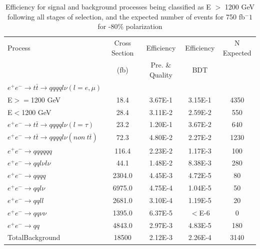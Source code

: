 \begin{table}
  \centering
  \begin{tabular}{l | c | c | c | c}
    \toprule
     Process     & Cross Section & Efficiency & Efficiency & N Expected\\
     & (fb) & Pre. \& Quality & BDT & \\
     \midrule
    $e^+e^-\rightarrow t\bar{t} \rightarrow qqqql\nu (l=e,\mu)$&  &  & &\\
     E$>=$1200 GeV & 18.4 & 3.67E-1 & 3.15E-1 & 4350\\
     E$<$1200 GeV & 28.4 & 3.11E-2 & 2.59E-2 & 550 \\
    \midrule
    $e^+e^-\rightarrow t\bar{t} \rightarrow qqqql\nu (l=\tau)$& 23.2 & 1.20E-1 & 3.67E-2 & 640 \\
    \midrule
    $e^+e^-\rightarrow t\bar{t} \rightarrow qqqql\nu (non ~ t\bar{t})$& 72.3 & 4.80E-2 & 2.27E-2 & 1230\\
    \midrule
    $e^+e^-\rightarrow qqqqqq$ & 116.4 &  2.23E-2 &1.17E-3 & 100 \\
    \midrule
    $e^+e^-\rightarrow qql\nu l\nu$ & 44.1 & 1.48E-2 & 8.38E-3 & 280\\
    \midrule
    $e^+e^-\rightarrow qqqq$ & 2304.0 & 4.45E-3 & 4.72E-5 & 80 \\
    \midrule
    $e^+e^-\rightarrow qql\nu$ & 6975.0 & 4.75E-4 & 1.04E-5 & 50 \\
    \midrule
    $e^+e^-\rightarrow qqll$ & 2681.0 & 3.10E-4 & 1.19E-5 & 20 \\
    \midrule
    $e^+e^-\rightarrow qq\nu\nu$ & 1395.0 & 6.37E-5 & $<$E-6 & 0 \\
    \midrule
    $e^+e^-\rightarrow qq$ & 4843.0 & 2.97E-3 & 4.83E-5 & 180\\
    \midrule
    \midrule
    TotalBackground & 18500 & 2.12E-3 & 2.26E-4 & 3140 \\
    \bottomrule
  \end{tabular}
  \caption{Efficiency for signal and background processes being classified as E $>$ 1200 GeV following all stages of selection, and the expected number of events for 750 fb$^-1$ for -80\% polarization}
  \label{table:topfinalefficienciesneg}
\end{table}


